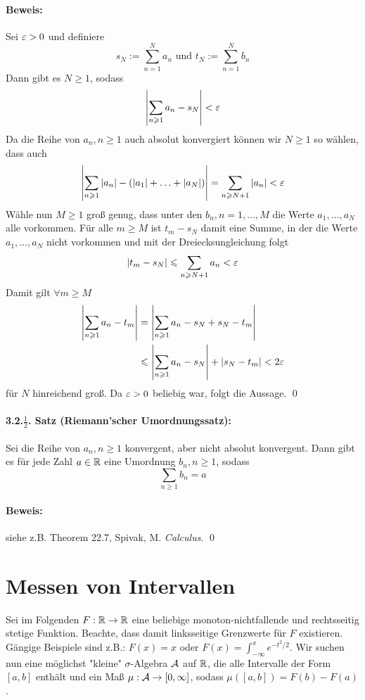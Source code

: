 \paragraph{Beweis:} Sei $\varepsilon>0$ und definiere
$$s_N:=\sum_{n=1}^Na_n\text{ und }t_N:=\sum_{n=1}^Nb_n$$
Dann gibt es $N\geq1$, sodass
$$\left|\sum_{n\geqslant1}a_n-s_N\right|<\varepsilon$$
Da die Reihe von $a_n,n\geq1$ auch absolut konvergiert k\"onnen wir $N\geq1$ so w\"ahlen, dass auch
$$\left|\sum_{n\geqslant1}|a_n|-(|a_1|+\hdots+|a_N|)\right|=\sum_{n\geqslant N+1}|a_n|<\varepsilon$$
W\"ahle nun $M\geq1$ gro\ss{} genug, dass unter den $b_n,n=1,\hdots,M$ die Werte $a_1,\hdots,a_N$ alle vorkommen. F\"ur alle $m\geq M$ ist $t_m-s_N$ damit eine Summe, in der die Werte $a_1,\hdots,a_N$ nicht vorkommen und mit der Dreiecksungleichung folgt 
$$|t_m-s_N|\leqslant\sum_{n\geqslant N+1}a_n<\varepsilon$$
Damit gilt $\forall m\geq M$
\begin{align*}
    \left|\sum_{n\geqslant1}a_n-t_m\right|&=\left|\sum_{n\geqslant1}a_n-s_N+s_N-t_m\right|\\
    &\leqslant\left|\sum_{n\geqslant1}a_n-s_N\right|+\left|s_N-t_m\right|<2\varepsilon
\end{align*}
f\"ur $N$ hinreichend gro\ss{}. Da $\varepsilon>0$ beliebig war, folgt die Aussage. \qed

\paragraph{3.2.$\frac{1}{2}$. Satz (Riemann'scher Umordnungssatz):}Sei die Reihe von $a_n,n\geq1$ konvergent, aber nicht absolut konvergent. Dann gibt es f\"ur jede Zahl $a\in\mathbb{R}$ eine Umordnung $b_n,n\geq1$, sodass
$$\sum_{n\geq1}b_n=a$$

\paragraph{Beweis:}siehe z.B. Theorem 22.7, Spivak, M. \textit{Calculus}. \qed

\section*{Messen von Intervallen}
Sei im Folgenden $F:\mathbb{R}\to\mathbb{R}$ eine beliebige monoton-nichtfallende und rechtsseitig stetige Funktion. Beachte, dass damit linksseitige Grenzwerte f\"ur $F$ existieren. G\"angige Beispiele sind z.B.: $F(x)=x$ oder $F(x)=\int_{-\infty}^xe^{-t^2/2}$. Wir suchen nun eine m\"oglichst "kleine" $\sigma$-Algebra $\mathcal{A}$ auf $\mathbb{R}$, die alle Intervalle der Form $[a,b]$ enth\"alt und ein Ma\ss{} $\mu:\mathcal{A}\to[0,\infty]$, sodass $\mu([a,b])=F(b)-F(a)$.

